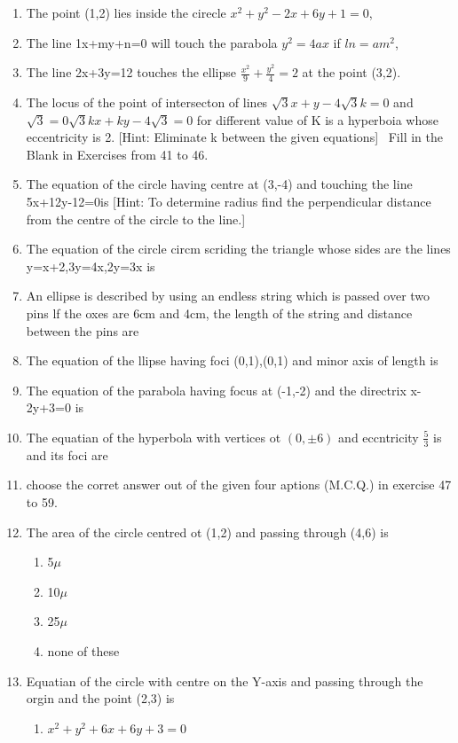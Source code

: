 \documentclass[12pt]{article}
\begin{document}
\begin{enumerate}
\item The point (1,2) lies inside the cirecle $x^2+y^2-2x+6y+1=0$,
\item The line 1x+my+n=0 will touch the parabola $y^2=4 ax$ if $ln =am^2$,
\item The line 2x+3y=12 touches the ellipse $\frac{x^2}{9}+\frac{y^2}{4}=2$ at the point (3,2).
\item The locus of the point of intersecton of lines $\sqrt{3}x+y-4\sqrt{3}k=0$ and $\sqrt{3}=0\sqrt{3}kx+ky-4\sqrt{3}=0$ for different value of K is a hyperboia whose eccentricity is 2.
[Hint: Eliminate k between the given equations]
\ Fill in the Blank in Exercises from 41 to 46.
\item The equation of the circle having centre at (3,-4) and touching the line 5x+12y-12=0is                     
[Hint: To determine radius find the perpendicular distance  from the centre of the circle to the line.]
\item The equation of the circle circm scriding the triangle whose sides are the lines y=x+2,3y=4x,2y=3x is           
\item An ellipse is described by using an endless string which is passed over two pins lf the oxes are 6cm and 4cm, the length of the string and distance between the pins are                    
\item The equation of the llipse having foci (0,1),(0,1) and minor axis of length is                  
\item The equation of the parabola having focus at (-1,-2) and the directrix x-2y+3=0 is       
\item The equatian of the hyperbola with vertices ot $(0,\pm6)$ and eccntricity $\frac{5}{3}$ is and its foci are          
\item choose the corret answer out of the given four aptions (M.C.Q.) in exercise 47 to 59.
\item The area of the circle centred ot (1,2) and passing through (4,6) is
\begin{enumerate}
\item 5$\mu$ 
\item 10$\mu$
 \item 25$\mu$ 
\item none of these
\end{enumerate}
\item Equatian of the circle with centre on the Y-axis and passing through the orgin and the point (2,3) is
\begin{enumerate}
\item $x^2+y^2+6x+6y+3=0$ 

\end{enumerate}
\end{enumerate}
\end{document}
